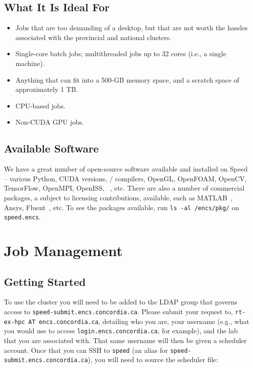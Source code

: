 \documentclass{easychair}
\begin{document}
\subsection{What It Is Ideal For}

\begin{itemize}
\item
Jobs that are too demanding of a desktop, but that are not worth the hassles  associated with the provincial and national clusters. 
\item
Single-core batch jobs; multithreaded jobs up to 32 cores (i.e., a single machine).
\item
Anything that can fit into a 500-GB memory space, and a scratch space of  approximately 1 TB. 
\item
CPU-based jobs. 
\item
Non-CUDA GPU jobs. 
\end{itemize}

\subsection{Available Software}

We have a great number of open-source software available and installed
on Speed -- various Python, CUDA versions, {\cpp}/{\java} compilers, OpenGL,
OpenFOAM, OpenCV, TensorFlow, OpenMPI, OpenISS, {\marf}~\cite{marf}, etc.
There are also a number of commercial packages, a subject to licensing
contributions, available, such as MATLAB~\cite{matlab,scholarpedia-matlab}, Ansys, Fluent~\cite{fluent}, etc. To see the
packages available, run \texttt{ls -al /encs/pkg/} on \texttt{speed.encs}.

\section{Job Management}
\label{sect:job-management}

\subsection{Getting Started}

To use the cluster you will need to be added to the LDAP group that governs access to \texttt{speed-submit.encs.concordia.ca}. Please submit your request to, 
\texttt{rt-ex-hpc AT encs.concordia.ca}, detailing who you are, your username (e.g., what you  would use to access \texttt{login.encs.concordia.ca}, for example), and the lab that you are  associated with. That same username will then be given a scheduler account. Once that you can SSH to \texttt{speed} (an alias for \texttt{speed-submit.encs.concordia.ca}), you will  
need to source the scheduler file:
\end{document}
